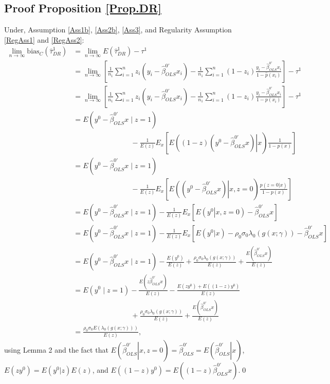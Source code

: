 \documentclass[11pt]{article}
\newcommand{\limes}{\lim \limits_{n\to\infty}}
\begin{document}
\subsection*{Proof Proposition \ref{Prop.DR}}
Under, Assumption \ref{Ass1b}, \ref{Ass2b}, \ref{Ass3}, and Regularity Assumption \ref{RegAss1} and \ref{RegAss2}: 
\begin{align*}
\limes \mbox{bias}_C(\hat \tau^1_{DR})&=\limes E(\hat\tau^1_{DR}) - \tau^1\\
&=\limes \left[\frac{1}{n_1}\sum  \limits_{i =1}^n z_i\left(y_i-\hat\beta^{0'}_{OLS}x_i\right)-\frac{1}{n_1}\sum  \limits_{i =1}^n(1-z_i)\frac{y_i-\hat\beta^{0'}_{OLS}x_i}{1-\hat p(x_i)} \right]- \tau^1\\
&=\limes \left[\frac{1}{n_1}\sum  \limits_{i =1}^n z_i\left(y_i-\hat\beta^{0'}_{OLS}x_i\right)-\frac{1}{n_1}\sum  \limits_{i =1}^n(1-z_i)\frac{y_i-\hat\beta^{0'}_{OLS}x_i}{1-p(x_i)} \right]- \tau^1\\
&=E(y^0 -\hat\beta^{0'}_{OLS} x \mid z=1)\\
&\qquad \qquad \qquad \qquad  - \frac{1}{E(z)}E_x\left[\left.E\left((1-z)(y^0-\hat\beta^{0'}_{OLS} x) \right| x \right)\frac{1}{1-p(x)} \right]  \\
&=E(y^0 -\hat\beta^{0'}_{OLS} x \mid z=1) \\
&\qquad \qquad \qquad \qquad - \frac{1}{E(z)}E_x\left[\left.E\left((y^0-\hat\beta^{0'}_{OLS} x) \right| x, z=0 \right)\frac{p(z=0|x)}{1-p(x)} \right]  \\
&=E(y^0 -\hat\beta^{0'}_{OLS} x \mid z=1) - \frac{1}{E(z)}E_x\left[\left.E\left(y^0\right| x, z=0 \right) -\hat\beta^{0'}_{OLS} x \right]  \\
&=E(y^0 -\hat\beta^{0'}_{OLS} x \mid z=1) - \frac{1}{E(z)}E_x\left[E(y^0 | x) - \rho_0\sigma_0\lambda_0(g(x; \gamma))- \hat\beta^{0'}_{OLS}  x \right]  \\
&=E(y^0 -\hat\beta^{0'}_{OLS} x \mid z=1) - \frac{E(y^0 ) }{E(z)} +\frac{\rho_0\sigma_0\lambda_0(g(x; \gamma))}{E(z)}+\frac{E\left(\hat\beta^{0'}_{OLS} x\right) }{E(z)} \\
&=E(y^0 \mid z=1) -\frac{E(z\hat\beta^{0'}_{OLS} x)}{E(z)}- \frac{E(z y^0 ) +E((1-z) y^0 ) }{E(z)} \\
&\qquad \qquad \qquad \qquad +\frac{\rho_0\sigma_0\lambda_0(g(x; \gamma))}{E(z)}+\frac{E\left( \hat\beta^{0'}_{OLS}x \right) }{E(z)} \\
&=\frac{\rho_0\sigma_0E(\lambda_0(g(x; \gamma)))}{E(z)},
\end{align*}
using Lemma 2 and the fact that $\left.E\left(\hat\beta^{0'}_{OLS} \right| x, z=0 \right)= \hat\beta^{0'}_{OLS}= \left.E\left(\hat\beta^{0'}_{OLS} \right| x\right)
$, $E(z y^0)=E(y^0|z)E(z)$, and $E((1-z) y^0 ) =E((1-z)  \hat\beta^{0'}_{OLS}x)$.\qed
\end{document}

